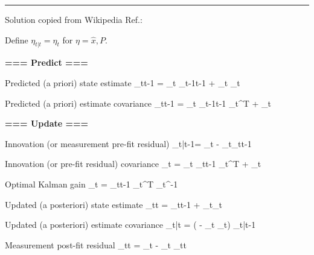 \hrule \noindent
Solution copied from Wikipedia Ref.\cite{wiki-kalman}:


Define $\eta_{t|t}=\eta_t$ for 
$\eta=\hat{x}, P$.

\noindent \textbf{=== Predict ===}

Predicted (a priori) state estimate
\beq
{}_{t\mid t-1} =
 _t
_{t-1\mid t-1}
 + _t _{t}
\eeq

Predicted (a priori) estimate covariance
\beq
{}_{t\mid t-1} =
 _t 
_{t-1\mid t-1}
 _t^\textsf{T} +
 _t
\eeq

\noindent\textbf{=== Update ===}

Innovation (or measurement 
pre-fit residual)
\beq
{}_{t|t-1}= 
_t - 
_t_{t\mid t-1}
\eeq

Innovation (or pre-fit residual)
 covariance
\beq
{}_t = _t 
_{t\mid t-1} 
_t^\textsf{T} +
 _t
\eeq


Optimal Kalman gain
\beq
{}_t = _{t\mid t-1}
_t^\textsf{T}
 _t^{-1}
\eeq


Updated (a posteriori) state estimate
\beq
{}_{t\mid t} =
 _{t\mid t-1} +
 _t_t
\eeq

Updated (a posteriori) estimate covariance
\beq
{}_{t|t} = \left( -
 _t _t\right) 
_{t|t-1} 
\eeq

Measurement post-fit residual
\beq
{}_{t\mid t} =
 _t - _t
_{t\mid t}
\eeq